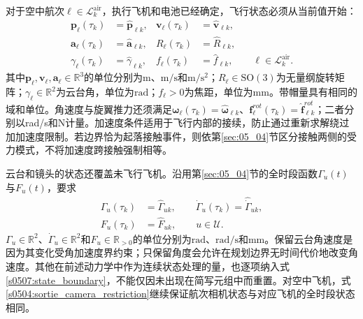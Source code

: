 对于空中航次$\ell\in\mathcal L_k^{\mathrm{air}}$，执行飞机和电池已经确定，飞行状态必须从当前值开始：
\begin{equation}
 \begin{aligned}
 \mathbf p_\ell(\tau_k)&=\widehat{\mathbf p}_{\ell k},&
 \mathbf v_\ell(\tau_k)&=\widehat{\mathbf v}_{\ell k},\\
 \mathbf a_\ell(\tau_k)&=\widehat{\mathbf a}_{\ell k},&
 R_\ell(\tau_k)&=\widehat R_{\ell k},\\
 \gamma_\ell(\tau_k)&=\widehat\gamma_{\ell k},&
 f_\ell(\tau_k)&=\widehat f_{\ell k},
 \qquad\ell\in\mathcal L_k^{\mathrm{air}}.
 \end{aligned}
 \label{s0507:airborne_boundary}
\end{equation}
其中$\mathbf p_\ell,\mathbf v_\ell,\mathbf a_\ell\in\mathbb R^3$的单位分别为$\mathrm m$、$\mathrm{m/s}$和$\mathrm{m/s^2}$；$R_\ell\in\mathrm{SO}(3)$为无量纲旋转矩阵；$\gamma_\ell\in\mathbb R^2$为云台角，单位为$\mathrm{rad}$；$f_\ell>0$为焦距，单位为$\mathrm{mm}$。带帽量具有相同的域和单位。角速度与旋翼推力还须满足$\boldsymbol\omega_\ell(\tau_k)=\widehat{\boldsymbol\omega}_{\ell k}$、$\mathbf f_\ell^{rot}(\tau_k)=\widehat{\mathbf f}_{\ell k}^{rot}$；二者分别以rad/s和N计量。加速度条件适用于飞行内部的接续，防止通过重新求解绕过加加速度限制。若边界恰为起落接触事件，则依第\ref{sec:05_04}节区分接触两侧的受力模式，不将加速度跨接触强制相等。

云台和镜头的状态还覆盖未飞行飞机。沿用第\ref{sec:05_04}节的全时段函数$\Gamma_u(t)$与$F_u(t)$，要求
\begin{equation}
 \begin{aligned}
 \Gamma_u(\tau_k)&=\widehat\Gamma_{uk},\qquad
 \dot\Gamma_u(\tau_k)=\widehat{\dot\Gamma}_{uk},\\
 F_u(\tau_k)&=\widehat F_{uk},
 \qquad u\in\mathcal U.
 \end{aligned}
 \label{s0507:camera_boundary}
\end{equation}
$\Gamma_u\in\mathbb R^2$、$\dot\Gamma_u\in\mathbb R^2$和$F_u\in\mathbb R_{>0}$的单位分别为$\mathrm{rad}$、$\mathrm{rad/s}$和$\mathrm{mm}$。保留云台角速度是因为其变化受角加速度界约束；只保留角度会允许在规划边界无时间代价地改变角速度。其他在前述动力学中作为连续状态处理的量，也逐项纳入式\eqref{s0507:state_boundary}，不能仅因未出现在简写元组中而重置。对空中飞机，式\eqref{s0504:sortie_camera_restriction}继续保证航次相机状态与对应飞机的全时段状态相同。


